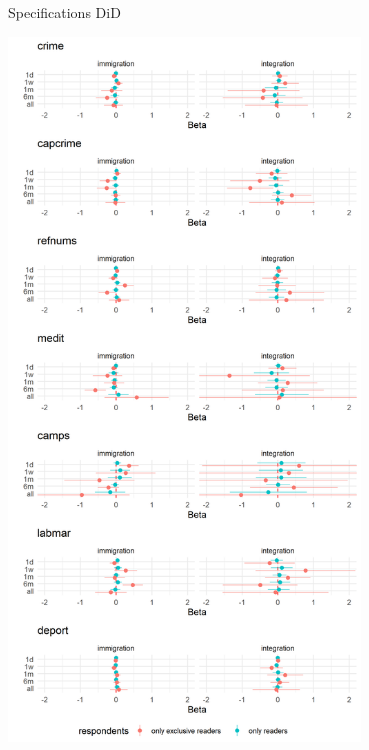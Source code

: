 \documentclass[
  ignorenonframetext,
]{beamer}
\begin{document}
\begin{frame}{Specifications DiD}
\protect\hypertarget{specifications-did}{}
\centering

\includegraphics[width=0.7\textwidth,height=\textheight]{vis/effectplot_frames_did.png}
\end{frame}
\end{document}
